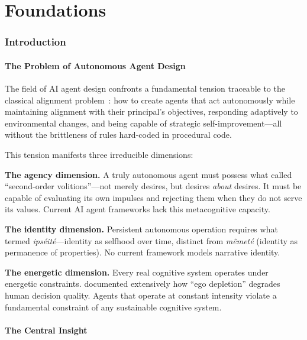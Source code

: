 \documentclass[12pt,a4paper,twoside]{article}
\theoremstyle{plain}
\theoremstyle{definition}
\theoremstyle{remark}
\begin{document}
\newpage
\tableofcontents
\newpage


\part{Foundations}

\section{Introduction}

\subsection{The Problem of Autonomous Agent Design}

The field of AI agent design confronts a fundamental tension traceable to the classical alignment problem~\citep{russell2019}: how to create agents that act autonomously while maintaining alignment with their principal's objectives, responding adaptively to environmental changes, and being capable of strategic self-improvement---all without the brittleness of rules hard-coded in procedural code.

This tension manifests three irreducible dimensions:

\textbf{The agency dimension.} A truly autonomous agent must possess what \citet{frankfurt1971} called ``second-order volitions''---not merely desires, but desires \emph{about} desires. It must be capable of evaluating its own impulses and rejecting them when they do not serve its values. Current AI agent frameworks lack this metacognitive capacity.

\textbf{The identity dimension.} Persistent autonomous operation requires what \citet{ricoeur1992} termed \emph{ips\'eit\'e}---identity as selfhood over time, distinct from \emph{m\^emet\'e} (identity as permanence of properties). No current framework models narrative identity.

\textbf{The energetic dimension.} Every real cognitive system operates under energetic constraints. \citet{kahneman2011} documented extensively how ``ego depletion'' degrades human decision quality. Agents that operate at constant intensity violate a fundamental constraint of any sustainable cognitive system.

\subsection{The Central Insight}
\end{document}
